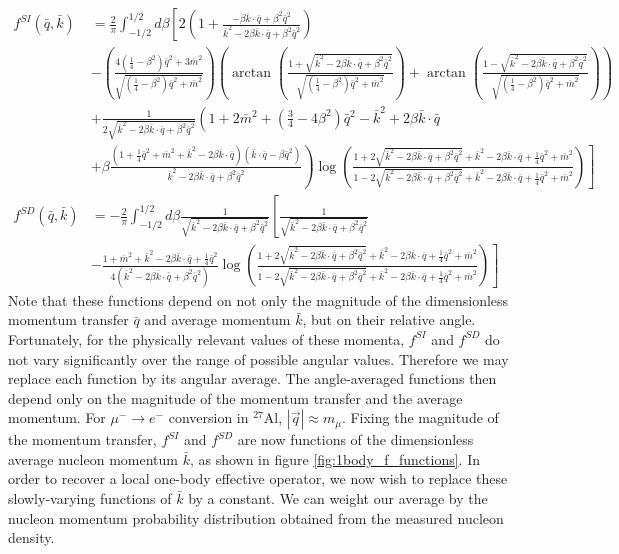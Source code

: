 \documentclass{book}[12pt]
\begin{document}
\begin{equation}
\begin{split}
f^{SI}(\bar{q},\bar{k})&=\frac{2}{\pi}\int_{-1/2}^{1/2}d\beta\left[2\left(1+\frac{-\beta\bar{k}\cdot\bar{q}+\beta^2\bar{q}^2}{\bar{k}^2-2\beta\bar{k}\cdot\bar{q}+\beta^2\bar{q}^2}\right)\right.\\
&-\left(\frac{4(\frac{1}{4}-\beta^2)\bar{q}^2+3\bar{m}^2}{\sqrt{(\frac{1}{4}-\beta^2)\bar{q}^2+\bar{m}^2}}\right)\left(\arctan\left(\frac{1+\sqrt{\bar{k}^2-2\beta\bar{k}\cdot\bar{q}+\beta^2\bar{q}^2}}{\sqrt{(\frac{1}{4}-\beta^2)\bar{q}^2+\bar{m}^2}}\right)+\arctan\left(\frac{1-\sqrt{\bar{k}^2-2\beta\bar{k}\cdot\bar{q}+\beta^2\bar{q}^2}}{\sqrt{(\frac{1}{4}-\beta^2)\bar{q}^2+\bar{m}^2}}\right)\right)\\
&+\frac{1}{2\sqrt{\bar{k}^2-2\beta\bar{k}\cdot\bar{q}+\beta^2\bar{q}^2}}\left(1+2\bar{m}^2+\left(\frac{3}{4}-4\beta^2\right)\bar{q}^2-\bar{k}^2+2\beta\bar{k}\cdot\bar{q}\right.\\
&\left.\left.+\beta\frac{\left(1+\frac{1}{4}\bar{q}^2+\bar{m}^2+\bar{k}^2-2\beta\bar{k}\cdot\bar{q}\right)\left(\bar{k}\cdot\bar{q}-\beta\bar{q}^2\right)}{\bar{k}^2-2\beta\bar{k}\cdot\bar{q}+\beta^2\bar{q}^2}\right)\log\left(\frac{1+2\sqrt{\bar{k}^2-2\beta\bar{k}\cdot\bar{q}+\beta^2\bar{q}^2}+\bar{k}^2-2\beta\bar{k}\cdot\bar{q}+\frac{1}{4}\bar{q}^2+\bar{m}^2}{1-2\sqrt{\bar{k}^2-2\beta\bar{k}\cdot\bar{q}+\beta^2\bar{q}^2}+\bar{k}^2-2\beta\bar{k}\cdot\bar{q}+\frac{1}{4}\bar{q}^2+\bar{m}^2}\right)\right]\\
f^{SD}(\bar{q},\bar{k})&=-\frac{2}{\pi}\int_{-1/2}^{1/2}d\beta\frac{1}{\sqrt{\bar{k}^2-2\beta\bar{k}\cdot\bar{q}+\beta^2\bar{q}^2}}\left[\frac{1}{\sqrt{\bar{k}^2-2\beta\bar{k}\cdot\bar{q}+\beta^2\bar{q}^2}}\right.\\
&\left.-\frac{1+\bar{m}^2+\bar{k}^2-2\beta\bar{k}\cdot\bar{q}+\frac{1}{4}\bar{q}^2}{4\left(\bar{k}^2-2\beta\bar{k}\cdot\bar{q}+\beta^2\bar{q}^2\right)}\log\left(\frac{1+2\sqrt{\bar{k}^2-2\beta\bar{k}\cdot\bar{q}+\beta^2\bar{q}^2}+\bar{k}^2-2\beta\bar{k}\cdot\bar{q}+\frac{1}{4}\bar{q}^2+\bar{m}^2}{1-2\sqrt{\bar{k}^2-2\beta\bar{k}\cdot\bar{q}+\beta^2\bar{q}^2}+\bar{k}^2-2\beta\bar{k}\cdot\bar{q}+\frac{1}{4}\bar{q}^2+\bar{m}^2}\right)\right]
\end{split}
\end{equation}
Note that these functions depend on not only the magnitude of the dimensionless momentum transfer $\bar{q}$ and average momentum $\bar{k}$, but on their relative angle. Fortunately, for the physically relevant values of these momenta, $f^{SI}$ and $f^{SD}$ do not vary significantly over the range of possible angular values. Therefore we may replace each function by its angular average. The angle-averaged functions then depend only on the magnitude of the momentum transfer and the average momentum. For $\mu^-\rightarrow e^-$ conversion in $^{27}$Al, $|\vec{q}|\approx m_{\mu}$. Fixing the magnitude of the momentum transfer, $f^{SI}$ and $f^{SD}$ are now functions of the dimensionless average nucleon momentum $\bar{k}$, as shown in figure \ref{fig:1body_f_functions}. In order to recover a local one-body effective operator, we now wish to replace these slowly-varying functions of $\bar{k}$ by a constant. We can weight our average by the nucleon momentum probability distribution obtained from the measured nucleon density.
\end{document}
